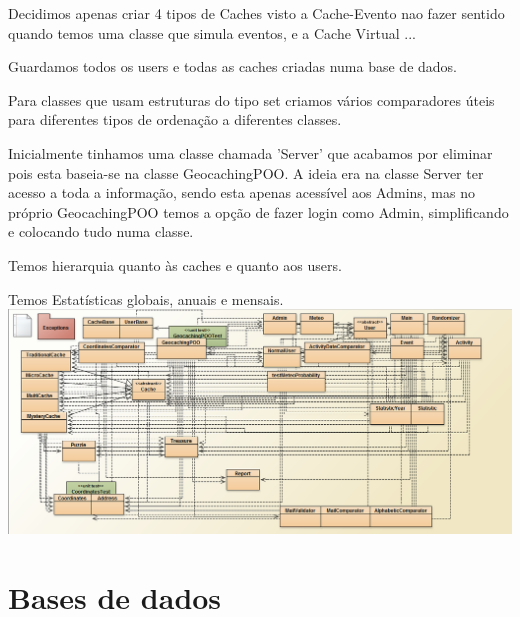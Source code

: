 \documentclass{article}
\begin{document}
\quad Decidimos apenas criar 4 tipos de Caches visto a Cache-Evento nao fazer sentido quando temos uma classe que simula eventos, e a Cache Virtual ...
\par Guardamos todos os users e todas as caches criadas numa base de dados.
\par Para classes que usam estruturas do tipo set criamos vários comparadores úteis para diferentes tipos de ordenação a diferentes classes.
\par Inicialmente tinhamos uma classe chamada 'Server' que acabamos por eliminar pois esta baseia-se na classe GeocachingPOO. A ideia era na classe Server ter acesso a toda a informação, sendo esta apenas acessível aos Admins, mas no próprio GeocachingPOO temos a opção de fazer login como Admin, simplificando e colocando tudo numa classe.
\par Temos hierarquia quanto às caches e quanto aos users.
\par Temos Estatísticas globais, anuais e mensais.
\\
\includegraphics[height=8\baselineskip,natwidth=369,natheight=430]{Diagrama.PNG}

\pagebreak
\section{Bases de dados}
\end{document}
